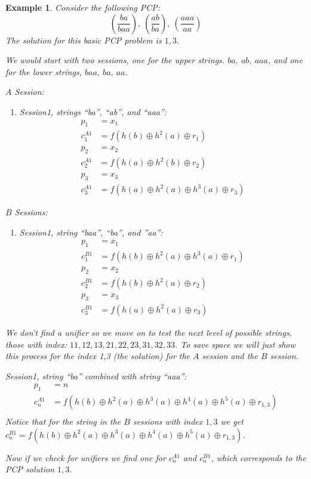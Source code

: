 \documentclass[11pt,twoside,a4paper]{article}
\newtheorem{example}{Example}
\begin{document}
\begin{example}
		Consider the following PCP:
		\[
		(\frac{ba}{baa}),~(\frac{ab}{ba}),~(\frac{aaa}{aa})
		\]
		The solution for this basic PCP problem is $1,3$.
		
		We would start with two sessions, one for the 
		upper strings. $ba, ~ab, ~aaa$, and one for the lower
		strings, $baa, ~ba, ~aa$. 
		
		\noindent
		$A$ Session:
		\begin{enumerate}
			\item Session1, strings ``ba'', ``ab'', and ``aaa'':
			\begin{align*}
			p_1 &= x_1\\
			c^{A1}_1 &= f(h(b) \oplus h^2(a) \oplus r_1)\\
			p_2 &= x_2\\
			c^{A1}_2 &= f(h(a) \oplus h^2(b) \oplus r_2)\\
			p_3 &= x_3\\
			c^{A1}_3 &= f(h(a) \oplus h^2(a) \oplus h^3(a) \oplus r_3)
			\end{align*}
		\end{enumerate}
		
		\noindent
		$B$ Sessions:
		\begin{enumerate}
			\item Session1, string ``baa'', ``ba'', and ''aa'':
			\begin{align*}
			p_1 &= x_1\\
			c^{B1}_1 &= f(h(b) \oplus h^2(a) \oplus h^3(a) \oplus r_1)\\
			p_2 &= x_2\\
			c^{B1}_2 &= f(h(b) \oplus h^2(a) \oplus r_2)\\
			p_3 &= x_3\\
			c^{B1}_3 &= f(h(a) \oplus h^2(a) \oplus r_3)
			\end{align*}
		\end{enumerate}
		
		We don't find a unifier so we move on to test the next level of
		possible strings, those with index: $11, 12, 13, 21, 22, 23, 31, 32, 33$. To save space we will just show this process for 
		the index 1,3 (the solution) for the $A$ session and the 
		$B$ session.
		
		Session1, string ``ba'' combined with string ``aaa'':
		\begin{align*}
		p_1 &= n\\
		c^{A1}_n &= f(h(b) \oplus h^2(a) 
		\oplus h^3(a) \oplus h^4(a) \oplus h^5(a)
		 \oplus r_{1,3})\\
		\end{align*}
		Notice that for the string in the $B$ sessions with index $1,3$ we get
		$c^{B1}_n= f(h(b) \oplus h^2(a) 
		\oplus h^3(a) \oplus h^4(a) \oplus h^5(a)
		\oplus r_{1,3})$.
		
		Now if we check for unifiers we find one for $c^{A1}_n$ and 
		$c^{B1}_n$, which corresponds to the PCP solution $1,3$.
		
\end{example}
\end{document}
